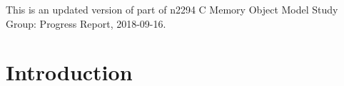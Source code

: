 \documentclass[12pt,acmsmall,review,screen]{acmart}\settopmatter{printfolios=true,printccs=false,printacmref=false}
\begin{document}




\maketitle




\newcommand{\myt}[1]{{\color{blue}#1}}
\newcommand{\myu}[1]{{\color{myudicolor}#1}}


This is an updated version of part of n2294 C Memory Object Model Study Group:
Progress Report, 2018-09-16.  


\section{Introduction}
\end{document}
